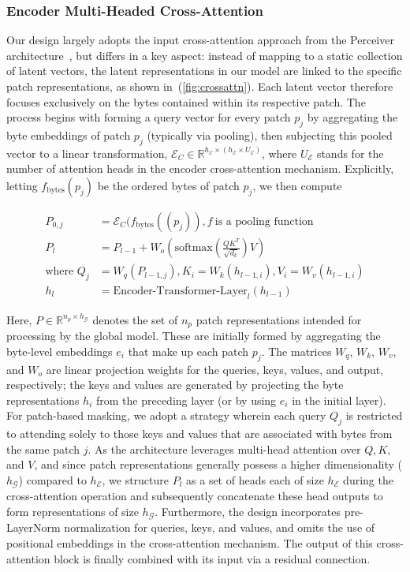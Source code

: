 \subsubsection{Encoder Multi-Headed Cross-Attention}
\label{sec:enc-cross-attn}
Our design largely adopts the input cross-attention approach from the Perceiver architecture~\citep{jaegle2021perceiver}, but differs in a key aspect: instead of mapping to a static collection of latent vectors, the latent representations in our model are linked to the specific patch representations, as shown in~(\autoref{fig:crossattn}). Each latent vector therefore focuses exclusively on the bytes contained within its respective patch. The process begins with forming a query vector for every patch $p_j$ by aggregating the byte embeddings of patch $p_j$ (typically via pooling), then subjecting this pooled vector to a linear transformation, $\mathcal{E}_{C} \in \mathbb{R}^{h_{\mathcal{E}} \times (h_{\mathcal{E}} \times U_{\mathcal{E}})}$, where $U_{\mathcal{E}}$ stands for the number of attention heads in the encoder cross-attention mechanism. Explicitly, letting $f_{\text{bytes}}(p_j)$ be the ordered bytes of patch $p_j$, we then compute

\begin{align}
P_{0,j} &= \mathcal{E}_{C}(f_\text{bytes}((p_j)), f~ \text{is a pooling function} \\
P_l &= P_{l-1} + W_o\left(\text{softmax}\left(\frac{QK^T}{\sqrt{d_k}}\right)V\right) \\
\text{where } Q_j &= W_q(P_{l-1,j}), K_i = W_k(h_{l-1,i}), V_i = W_v(h_{l-1,i}) \\
h_l &= \text{Encoder-Transformer-Layer}_l(h_{l-1})
\end{align}

Here, $P \in \mathbb{R}^{n_p \times h_{\mathcal{G}}}$ denotes the set of $n_p$ patch representations intended for processing by the global model. These are initially formed by aggregating the byte-level embeddings $e_i$ that make up each patch $p_j$. The matrices $W_q$, $W_k$, $W_v$, and $W_o$ are linear projection weights for the queries, keys, values, and output, respectively; the keys and values are generated by projecting the byte representations $h_i$ from the preceding layer (or by using $e_i$ in the initial layer). For patch-based masking, we adopt a strategy wherein each query $Q_j$ is restricted to attending solely to those keys and values that are associated with bytes from the same patch $j$. As the architecture leverages multi-head attention over $Q, K,$ and $V$, and since patch representations generally possess a higher dimensionality ($h_{\mathcal{G}}$) compared to $h_{\mathcal{E}}$, we structure $P_l$ as a set of heads each of size $h_{\mathcal{E}}$ during the cross-attention operation and subsequently concatenate these head outputs to form representations of size $h_{\mathcal{G}}$. Furthermore, the design incorporates pre-LayerNorm normalization for queries, keys, and values, and omits the use of positional embeddings in the cross-attention mechanism. The output of this cross-attention block is finally combined with its input via a residual connection.

